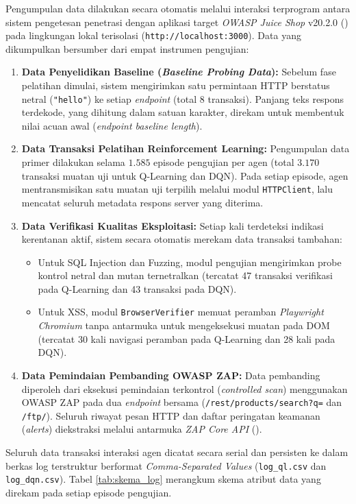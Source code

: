 Pengumpulan data dilakukan secara otomatis melalui interaksi terprogram antara sistem pengetesan penetrasi dengan aplikasi target \textit{OWASP Juice Shop} v20.2.0 (\cite{owaspJuiceShop}) pada lingkungan lokal terisolasi (\texttt{http://localhost:3000}). Data yang dikumpulkan bersumber dari empat instrumen pengujian:
\begin{enumerate}
    \item \textbf{Data Penyelidikan Baseline (\textit{Baseline Probing Data}):} Sebelum fase pelatihan dimulai, sistem mengirimkan satu permintaan HTTP berstatus netral (\texttt{"hello"}) ke setiap \textit{endpoint} (total 8 transaksi). Panjang teks respons terdekode, yang dihitung dalam satuan karakter, direkam untuk membentuk nilai acuan awal (\textit{endpoint baseline length}).
    \item \textbf{Data Transaksi Pelatihan Reinforcement Learning:} Pengumpulan data primer dilakukan selama $1.585$ episode pengujian per agen (total $3.170$ transaksi muatan uji untuk Q-Learning dan DQN). Pada setiap episode, agen mentransmisikan satu muatan uji terpilih melalui modul \texttt{HTTPClient}, lalu mencatat seluruh metadata respons server yang diterima.
    \item \textbf{Data Verifikasi Kualitas Eksploitasi:} Setiap kali terdeteksi indikasi kerentanan aktif, sistem secara otomatis merekam data transaksi tambahan:
    \begin{itemize}
        \item Untuk SQL Injection dan Fuzzing, modul pengujian mengirimkan probe kontrol netral dan mutan ternetralkan (tercatat 47 transaksi verifikasi pada Q-Learning dan 43 transaksi pada DQN). 
        \item Untuk XSS, modul \texttt{BrowserVerifier} memuat peramban \textit{Playwright Chromium} tanpa antarmuka untuk mengeksekusi muatan pada DOM (tercatat 30 kali navigasi peramban pada Q-Learning dan 28 kali pada DQN). 
    \end{itemize}
    \item \textbf{Data Pemindaian Pembanding OWASP ZAP:} Data pembanding diperoleh dari eksekusi pemindaian terkontrol (\textit{controlled scan}) menggunakan OWASP ZAP pada dua \textit{endpoint} bersama (\texttt{/rest/products/search?q=} dan \texttt{/ftp/}). Seluruh riwayat pesan HTTP dan daftar peringatan keamanan (\textit{alerts}) diekstraksi melalui antarmuka \textit{ZAP Core API} (\cite{owaspZapApi}).
\end{enumerate}

Seluruh data transaksi interaksi agen dicatat secara serial dan persisten ke dalam berkas log terstruktur berformat \textit{Comma-Separated Values} (\texttt{log\_ql.csv} dan \texttt{log\_dqn.csv}). Tabel \ref{tab:skema_log} merangkum skema atribut data yang direkam pada setiap episode pengujian.


